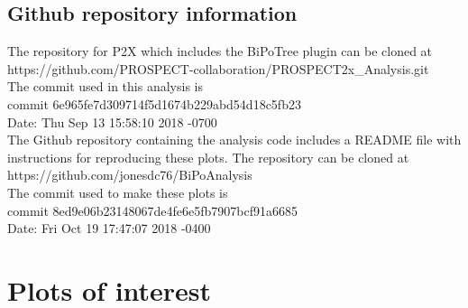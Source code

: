 \subsection{Github repository information\label{sec:github}}
The repository for P2X which includes the BiPoTree plugin can be cloned at\\ https://github.com/PROSPECT-collaboration/PROSPECT2x\_Analysis.git\\
The commit used in this analysis is \\
commit 6e965fe7d309714f5d1674b229abd54d18c5fb23\\
Date:   Thu Sep 13 15:58:10 2018 -0700\\

The Github repository containing the analysis code includes a README file with instructions for reproducing these plots. The repository can be cloned at \\
https://github.com/jonesdc76/BiPoAnalysis\\
The commit used to make these plots is\\
commit 8ed9e06b23148067de4fe6e5fb7907bcf91a6685\\
Date:   Fri Oct 19 17:47:07 2018 -0400\\
\newpage
\section{Plots of interest}
